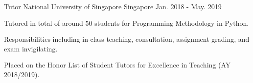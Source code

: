 

\begin{cventries}

  \cventry
    {Tutor} %
    {National University of Singapore} %
    {Singapore} %
    {Jan. 2018 - May. 2019} %
    {
      \begin{cvitems} %
        \item {Tutored in total of around 50 students for Programming Methodology in Python.}
        \item {Responsibilities including in-class teaching, consultation, assignment grading, and exam invigilating.}
        \item {Placed on the Honor List of Student Tutors for Excellence in Teaching (AY 2018/2019).}
      \end{cvitems}
    }

\end{cventries}
